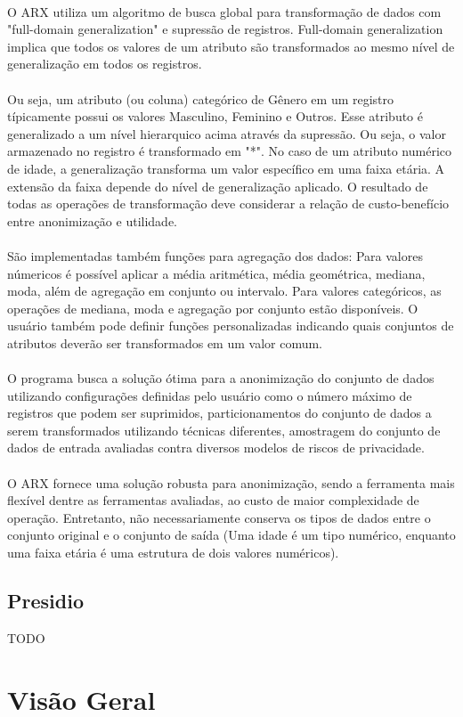 \paragraph{} O ARX utiliza um algoritmo de busca global para transformação de dados com "full-domain generalization" e supressão de registros. Full-domain generalization implica que todos os  valores de um atributo são transformados ao mesmo nível de generalização em todos os registros.

\paragraph{} Ou seja, um atributo (ou coluna) categórico de Gênero em um registro típicamente possui os valores Masculino, Feminino e Outros. Esse atributo é generalizado a um nível hierarquico acima através da supressão. Ou seja, o valor armazenado no registro é transformado em "*". No caso de um atributo numérico de idade, a generalização transforma um valor específico em uma faixa etária. A extensão da faixa depende do nível de generalização aplicado. O resultado de todas as operações de transformação deve considerar a relação de custo-benefício entre anonimização e utilidade.

\paragraph{} São implementadas também funções para agregação dos dados: Para valores númericos é possível aplicar a média aritmética, média geométrica, mediana, moda, além de agregação em conjunto ou intervalo. Para valores categóricos, as operações de mediana, moda e agregação por conjunto estão disponíveis. O usuário também pode definir funções personalizadas indicando quais conjuntos de atributos deverão ser transformados em um valor comum.

\paragraph{} O programa busca a solução ótima para a anonimização do conjunto de dados utilizando configurações definidas pelo usuário como o número máximo de registros que podem ser suprimidos, particionamentos do conjunto de dados a serem transformados utilizando técnicas diferentes, amostragem do conjunto de dados de entrada avaliadas contra diversos modelos de riscos de privacidade.

\paragraph{} O ARX fornece uma solução robusta para anonimização, sendo a ferramenta mais flexível dentre as ferramentas avaliadas, ao custo de maior complexidade de operação. Entretanto, não necessariamente conserva os tipos de dados entre o conjunto original e o conjunto de saída (Uma idade é um tipo numérico, enquanto uma faixa etária é uma estrutura de dois valores numéricos).

\subsection{Presidio}

\cite{presidio}

TODO

\section{Visão Geral}